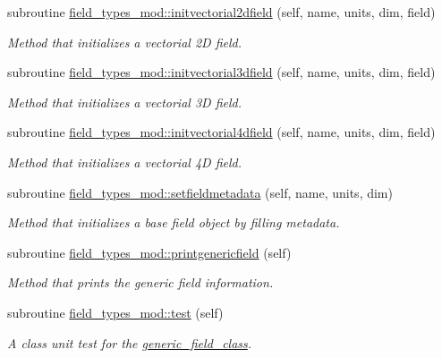 \begin{DoxyCompactItemize}
subroutine \mbox{\hyperlink{namespacefield__types__mod_a31c78f82114b5bf8014f7aac09030c32}{field\+\_\+types\+\_\+mod\+::initvectorial2dfield}} (self, name, units, dim, field)
\begin{DoxyCompactList}\small\item\em Method that initializes a vectorial 2D field. \end{DoxyCompactList}\item 
subroutine \mbox{\hyperlink{namespacefield__types__mod_a712c0d9941013a8f8c28e684a7c7f4c7}{field\+\_\+types\+\_\+mod\+::initvectorial3dfield}} (self, name, units, dim, field)
\begin{DoxyCompactList}\small\item\em Method that initializes a vectorial 3D field. \end{DoxyCompactList}\item 
subroutine \mbox{\hyperlink{namespacefield__types__mod_ada2cd66d3baca6f614b2dfb477fc9b3b}{field\+\_\+types\+\_\+mod\+::initvectorial4dfield}} (self, name, units, dim, field)
\begin{DoxyCompactList}\small\item\em Method that initializes a vectorial 4D field. \end{DoxyCompactList}\item 
subroutine \mbox{\hyperlink{namespacefield__types__mod_af6090a0e4ff4834c37af5f33d35fa03d}{field\+\_\+types\+\_\+mod\+::setfieldmetadata}} (self, name, units, dim)
\begin{DoxyCompactList}\small\item\em Method that initializes a base field object by filling metadata. \end{DoxyCompactList}\item 
subroutine \mbox{\hyperlink{namespacefield__types__mod_a9b7f13b8dea24ec75f1a017a943a3fb5}{field\+\_\+types\+\_\+mod\+::printgenericfield}} (self)
\begin{DoxyCompactList}\small\item\em Method that prints the generic field information. \end{DoxyCompactList}\item 
subroutine \mbox{\hyperlink{namespacefield__types__mod_ad1448b34724138b4adf0d0abda0bb012}{field\+\_\+types\+\_\+mod\+::test}} (self)
\begin{DoxyCompactList}\small\item\em A class \textquotesingle{}unit\textquotesingle{} test for the \mbox{\hyperlink{structfield__types__mod_1_1generic__field__class}{generic\+\_\+field\+\_\+class}}. \end{DoxyCompactList}\item 

\end{DoxyCompactItemize}
